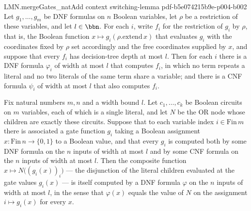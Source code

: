 \begin{lemma}
  {LMN.mergeGates_natAdd}
  {context}
  {switching-lemma}
  {pdf-b5e074215b9e-p004-b002}
Let $g_1,\dots,g_m$ be DNF formulas on $n$ Boolean variables, let $\rho$ be a
restriction of these variables, and let $l\in\bbn$. For each $i$, write $f_i$ for the
restriction of $g_i$ by $\rho$, that is, the Boolean function $x \mapsto
g_i(\rho.\mathrm{extend}\,x)$ that evaluates $g_i$ with the coordinates fixed by $\rho$
set accordingly and the free coordinates supplied by $x$, and suppose that every $f_i$
has decision-tree depth at most $l$. Then for each $i$ there is a DNF formula
$\varphi_i$ of width at most $l$ that computes $f_i$, in which no term repeats a literal
and no two literals of the same term share a variable; and there is a CNF formula
$\psi_i$ of width at most $l$ that also computes $f_i$.
\end{lemma}

\begin{lemma}
\label{LMN.or_of_lit_children_dnf}
\leanok
{}
Fix natural numbers $m,n$ and a width bound $l$. Let $c_1,\dots,c_k$ be Boolean circuits
on $m$ variables, each of which is a single literal, and let $N$ be the OR node whose
children are exactly these circuits. Suppose that to each variable index $i \in
\mathrm{Fin}\,m$ there is associated a gate function $g_i$ taking a Boolean assignment
$x : \mathrm{Fin}\,n \to \{0,1\}$ to a Boolean value, and that every $g_i$ is computed
both by some DNF formula on the $n$ inputs of width at most $l$ and by some CNF formula
on the $n$ inputs of width at most $l$. Then the composite function $x \mapsto
N\bigl((g_i(x))_{i}\bigr)$ — the disjunction of the literal children evaluated at the
gate values $g_i(x)$ — is itself computed by a DNF formula $\varphi$ on the $n$ inputs
of width at most $l$, in the sense that $\varphi(x)$ equals the value of $N$ on the
assignment $i \mapsto g_i(x)$ for every $x$.
\end{lemma}

